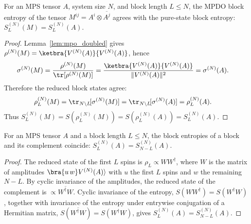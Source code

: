 \begin{lemma}
    \label{lem:blockEntropy_doubledTensor}
    \leanok
    For an MPS tensor $A$, system size $N$, and block length $L\le N$, the MPDO
    block entropy of the tensor $M^{ij}=A^i\otimes\overline{A^j}$ agrees
    with the pure-state block entropy:
    $S_L^{(N)}(M)=S_L^{(N)}(A)$.
\end{lemma}
\begin{proof}\leanok
    Lemma~\ref{lem:mpo_doubled} gives
    $\rho^{(N)}(M)=\ketbra{V^{(N)}(A)}{V^{(N)}(A)}$, hence
    \begin{align}
        \sigma^{(N)}(M)
         & =
        \frac{\rho^{(N)}(M)}{\tr[\rho^{(N)}(M)]}
        =
        \frac{\ketbra{V^{(N)}(A)}{V^{(N)}(A)}}{\|V^{(N)}(A)\|^2}
        =
        \sigma^{(N)}(A).
        \notag
    \end{align}
    Therefore the reduced block states agree:
    \begin{align}
        \rho_L^{(N)}(M)
         & =
        \tr_{N\setminus L}\![\sigma^{(N)}(M)]
        =
        \tr_{N\setminus L}\![\sigma^{(N)}(A)]
        =
        \rho_L^{(N)}(A).
        \notag
    \end{align}
    Thus
    $S_L^{(N)}(M)
        =S(\rho_L^{(N)}(M))
        =S(\rho_L^{(N)}(A))
        =S_L^{(N)}(A)$.
\end{proof}

\begin{lemma}\label{lem:schmidt_symmetry}
    \leanok
    For an MPS tensor $A$ and a block length $L\le N$, the block entropies of a
    block and its complement coincide:
    $S_L^{(N)}(A)=S_{N-L}^{(N)}(A)$.
\end{lemma}
\begin{proof}\leanok
    The reduced state of the first $L$ spins is $\rho_L\propto WW^\dagger$, where
    $W$ is the matrix of amplitudes $\bra{u\,w}V^{(N)}(A)\rangle$ with $u$ the
    first $L$ spins and $w$ the remaining $N-L$. By cyclic invariance of the
    amplitudes, the reduced state of the complement is
    $\propto\overline{W^\dagger W}$.
    Cyclic invariance of the entropy,
    $S(WW^\dagger)=S(W^\dagger W)$, together with invariance of the entropy
    under entrywise conjugation of a Hermitian matrix,
    $S(\overline{W^\dagger W})=S(W^\dagger W)$, gives
    $S_L^{(N)}(A)=S_{N-L}^{(N)}(A)$.
\end{proof}

